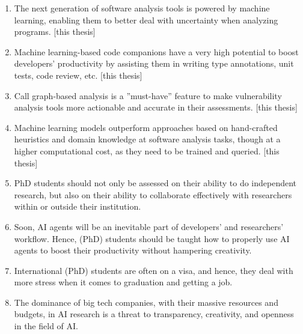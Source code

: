 \documentclass{propositions}
\begin{document}
\begin{enumerate}[itemsep=1pt]
\item The next generation of software analysis tools is powered by machine learning, enabling them to better deal with uncertainty when analyzing programs. [this thesis]
  \item Machine learning-based code companions have a very high potential to boost developers' productivity by assisting them in writing type annotations, unit tests, code review, etc. [this thesis]
  \item Call graph-based analysis is a ”must-have” feature to make vulnerability analysis tools more actionable and accurate in their assessments. [this thesis]
  \item Machine learning models outperform approaches based on hand-crafted heuristics and domain knowledge at software analysis tasks, though at a higher computational cost, as they need to be trained and queried. [this thesis]
  \item PhD students should not only be assessed on their ability to do independent research, but also on their ability to collaborate effectively with researchers within or outside their institution.
  \item Soon, AI agents will be an inevitable part of developers' and researchers' workflow. Hence, (PhD) students should be taught how to properly use AI agents to boost their productivity without hampering creativity.

  \item International (PhD) students are often on a visa, and hence, they deal with more stress when it comes to graduation and getting a job.
  \item The dominance of big tech companies, with their massive resources and budgets, in AI research is a threat to transparency, creativity, and openness in the field of AI.
\end{enumerate}
\end{document}
